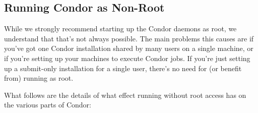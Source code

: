 \subsection{Running Condor as Non-Root}
\label{sec:Non-Root}

While we strongly recommend starting up the Condor daemons as root, we
understand that that's not always possible.  The main problems this
causes are if you've got one Condor installation shared by many users
on a single machine, or if you're setting up your machines to execute
Condor jobs.  If you're just setting up a submit-only installation for
a single user, there's no need for (or benefit from) running as
root.  

What follows are the details of what effect running without root
access has on the various parts of Condor:

